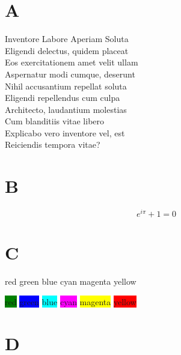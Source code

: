 \documentclass[12pt]{article}
\begin{document}
\section{A}

\tiny         Inventore Labore Aperiam Soluta \\
\scriptsize   Eligendi delectus, quidem placeat \\
\footnotesize Eos exercitationem amet velit ullam \\
\small        Aspernatur modi cumque, deserunt \\
\normalsize   Nihil accusantium repellat soluta \\
\large        Eligendi repellendus cum culpa \\
\Large        Architecto, laudantium molestias \\
\LARGE        Cum blanditiis vitae libero \\
\huge         Explicabo vero inventore vel, est \\
\Huge         Reiciendis tempora vitae?

\newpage

\section{B}

\begin{equation}
e^{i\pi} + 1 = 0
\label{A}
\end{equation}

\newpage

\section{C}

\par
{\color{red} red}
{\color{green} green}
{\color{blue} blue}
{\color{cyan} cyan}
{\color{magenta} magenta}
{\color{yellow} yellow}

\par
\colorbox{green}{\color{red} red}
\colorbox{blue}{\color{green} green}
\colorbox{cyan}{\color{blue} blue}
\colorbox{magenta}{\color{cyan} cyan}
\colorbox{yellow}{\color{magenta} magenta}
\colorbox{red}{\color{yellow} yellow}

\newpage

\pagecolor{red}

\section{D}
\end{document}
